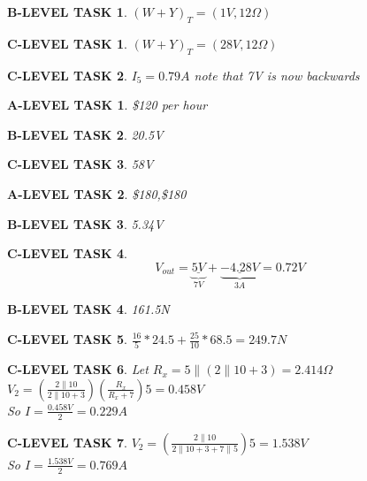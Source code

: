 \documentclass{book}
\numberwithin{equation}{section}
\newtheorem{alevel}{A-LEVEL TASK}
\newtheorem{blevel}{B-LEVEL TASK}
\newtheorem{clevel}{C-LEVEL TASK}
\theoremstyle{definition}
\begin{document}
\begin{blevel}$(W+Y)_T=(1V,12\Omega)$\end{blevel}
\begin{clevel}$(W+Y)_T=(28V,12\Omega)$\end{clevel}
\begin{clevel}$I_5=0.79A$ note that 7V is now backwards\end{clevel}
\begin{alevel}\$120 per hour\end{alevel}
\begin{blevel}20.5V\end{blevel}
\begin{clevel}58V\end{clevel}
\begin{alevel}\$180,\$180\end{alevel}
\begin{blevel}5.34V\end{blevel}
\begin{clevel}
\[
V_{out}=\underbrace{\underline{5V}}_{7V}+\underbrace{\underline{-4.28V}}_{3A} = 0.72V
\]
\end{clevel}

\begin{blevel}161.5N\end{blevel}
\begin{clevel}$\frac{16}{5}*24.5+\frac{25}{10}*68.5=249.7N$\end{clevel}

\begin{clevel} Let $R_x=5\parallel(2\parallel 10 +3) = 2.414\Omega$\\
$V_2=(\frac{2\parallel 10}{2\parallel 10 + 3})(\frac{R_x}{R_x+7})5=0.458V$\\
So $I=\frac{0.458V}{2}=0.229A$
\end{clevel}
\begin{clevel}
$V_2=(\frac{2\parallel 10}{2\parallel 10 + 3+7\parallel 5})5=1.538V$\\
So $I=\frac{1.538V}{2}=0.769A$
\end{clevel}
\end{document}
